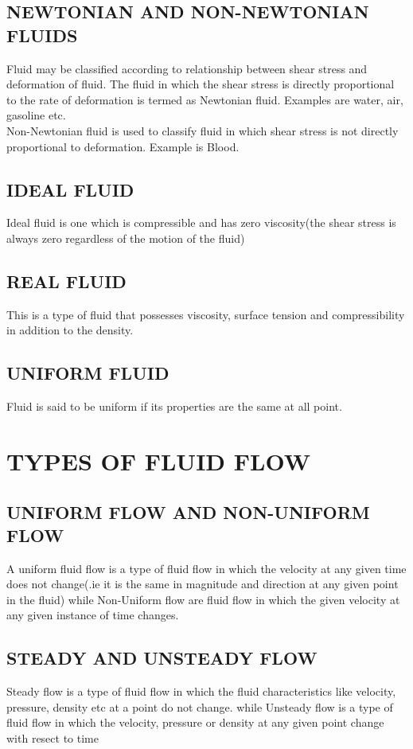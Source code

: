 \documentclass[11pt]{report}
\begin{document}
	\subsection{NEWTONIAN AND NON-NEWTONIAN FLUIDS}
	Fluid may be classified according to relationship between shear stress and deformation of fluid. The fluid in which the shear stress is directly proportional to the rate of deformation is termed as Newtonian fluid. Examples are water, air, gasoline etc.\\
	Non-Newtonian fluid is used to classify fluid in which shear stress is not directly proportional to deformation. Example is Blood.
	
	\subsection{IDEAL FLUID}
	Ideal fluid is one which is compressible and has zero viscosity(the shear stress is always zero regardless of the motion of the fluid)
	
	\subsection{REAL FLUID}
	This is a type of fluid that possesses viscosity, surface tension and compressibility in addition to the density.
	
	\subsection{UNIFORM FLUID}
	Fluid is said to be uniform if its properties are the same at all point.
	
	
	\section{TYPES OF FLUID FLOW}
	
	\subsection{UNIFORM FLOW AND NON-UNIFORM FLOW}
	A uniform fluid flow is a type of fluid flow in which the velocity at any given time does not change(.ie it is the same in magnitude and direction at any given point in the fluid) while Non-Uniform flow are fluid flow in which the given velocity at any given instance of time changes.
	
	\subsection{STEADY AND UNSTEADY FLOW}
	Steady flow is a type of fluid flow in which the fluid characteristics like velocity, pressure, density etc at a point do not change. while Unsteady flow is a type of fluid flow in which the velocity, pressure or density at any given point change with resect to time
	
\end{document}
